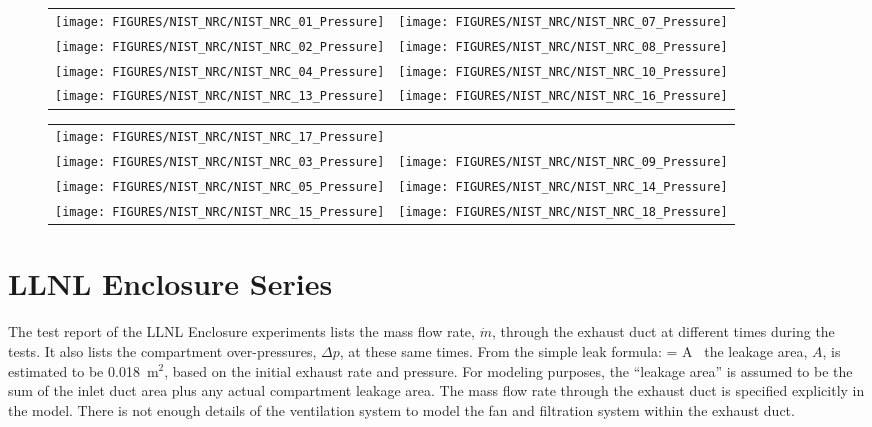 \begin{figure}[p]
\begin{tabular*}{\textwidth}{l@{\extracolsep{\fill}}r}
\texttt{[image: FIGURES/NIST\_NRC/NIST\_NRC\_01\_Pressure]} &
\texttt{[image: FIGURES/NIST\_NRC/NIST\_NRC\_07\_Pressure]} \\
\texttt{[image: FIGURES/NIST\_NRC/NIST\_NRC\_02\_Pressure]} &
\texttt{[image: FIGURES/NIST\_NRC/NIST\_NRC\_08\_Pressure]} \\
\texttt{[image: FIGURES/NIST\_NRC/NIST\_NRC\_04\_Pressure]} &
\texttt{[image: FIGURES/NIST\_NRC/NIST\_NRC\_10\_Pressure]} \\
\texttt{[image: FIGURES/NIST\_NRC/NIST\_NRC\_13\_Pressure]} &
\texttt{[image: FIGURES/NIST\_NRC/NIST\_NRC\_16\_Pressure]}
\end{tabular*}
\label{NIST_NRC_Pressure_Closed}
\end{figure}

\begin{figure}[p]
\begin{tabular*}{\textwidth}{l@{\extracolsep{\fill}}r}
\texttt{[image: FIGURES/NIST\_NRC/NIST\_NRC\_17\_Pressure]} &
   \\
\texttt{[image: FIGURES/NIST\_NRC/NIST\_NRC\_03\_Pressure]} &
\texttt{[image: FIGURES/NIST\_NRC/NIST\_NRC\_09\_Pressure]} \\
\texttt{[image: FIGURES/NIST\_NRC/NIST\_NRC\_05\_Pressure]} &
\texttt{[image: FIGURES/NIST\_NRC/NIST\_NRC\_14\_Pressure]} \\
\texttt{[image: FIGURES/NIST\_NRC/NIST\_NRC\_15\_Pressure]} &
\texttt{[image: FIGURES/NIST\_NRC/NIST\_NRC\_18\_Pressure]}
\end{tabular*}
\label{NIST_NRC_Pressure_Open}
\end{figure}

\clearpage

\section{LLNL Enclosure Series}

The test report of the LLNL Enclosure experiments lists the mass flow rate, $\dot{m}$, through the exhaust duct at different times
during the tests. It also lists the compartment over-pressures, $\Delta p$, at these same times. From the simple leak formula:
\be {} = A \,  \ee
the leakage area, $A$, is estimated to be 0.018~m$^2$, based on the initial exhaust rate and pressure.
For modeling purposes, the ``leakage area'' is assumed to be the sum of the
inlet duct area plus any actual compartment leakage area. The mass flow rate through the exhaust duct is specified explicitly in
the model. There is not enough details of the ventilation system to model the fan and filtration system within the exhaust duct.

